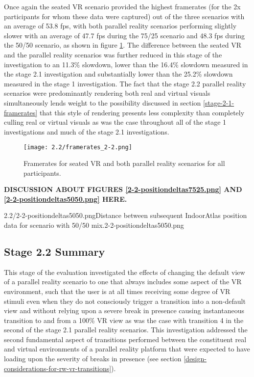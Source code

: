 Once again the seated VR scenario provided the highest framerates (for the 2x participants for whom these data were captured) out of the three scenarios with an average of 53.8 fps, with both parallel reality scenarios performing slightly slower with an average of 47.7 fps during the 75/25 scenario and 48.3 fps during the 50/50 scenario, as shown in figure \ref{framerates_2-2.png}. The difference between the seated VR and the parallel reality scenarios was further reduced in this stage of the investigation to an 11.3\% slowdown, lower than the 16.4\% slowdown measured in the stage 2.1 investigation and substantially lower than the 25.2\% slowdown measured in the stage 1 investigation. The fact that the stage 2.2 parallel reality scenarios were predominantly rendering both real and virtual visuals simultaneously lends weight to the possibility discussed in section \ref{stage-2-1-framerates} that this style of rendering presents less complexity than completely culling real or virtual visuals as was the case throughout all of the stage 1 investigations and much of the stage 2.1 investigations.

\begin{figure}[h]
	\begin{center}
	\texttt{[image: 2.2/framerates\_2-2.png]}
	\caption{Framerates for seated VR and both parallel reality scenarios for all participants.}
	\label{framerates_2-2.png}
	\end{center}
\end{figure}

\textbf{DISCUSSION ABOUT FIGURES \ref{2-2-positiondeltas7525.png} AND \ref{2-2-positiondeltas5050.png} HERE.}

       {2.2/2-2-positiondeltas5050.png}{Distance between subsequent IndoorAtlas position data for scenario with 50/50 mix.}{2-2-positiondeltas5050.png}


\subsection{Stage 2.2 Summary}

This stage of the evaluation investigated the effects of changing the default view of a parallel reality scenario to one that always includes some aspect of the VR environment, such that the user is at all times receiving some degree of VR stimuli even when they do not consciously trigger a transition into a non-default view and without relying upon a severe break in presence causing instantaneous transition to and from a 100\% VR view as was the case with transition 4 in the second of the stage 2.1 parallel reality scenarios. This investigation addressed the second fundamental aspect of transitions performed between the constituent real and virtual environments of a parallel reality platform that were expected to have loading upon the severity of breaks in presence (see section \ref{design-considerations-for-rw-vr-transitions}).

